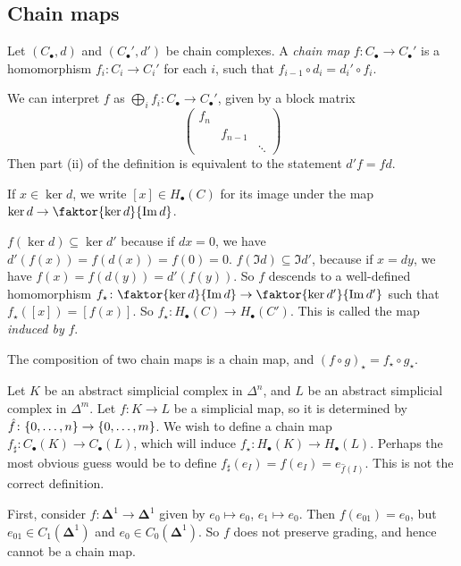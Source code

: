 \subsection{Chain maps}
\begin{definition}
	Let \( (C_\bullet, d) \) and \( (C_\bullet', d') \) be chain complexes.
	A \emph{chain map} \( f \colon C_\bullet \to C_\bullet' \) is a homomorphism \( f_i \colon C_i \to C_i' \) for each \( i \), such that \( f_{i-1} \circ d_i = d_i' \circ f_i \).
\end{definition}
\begin{remark}
	We can interpret \( f \) as \( \bigoplus_i f_i \colon C_\bullet \to C_\bullet' \), given by a block matrix
	\[ \begin{pmatrix}
		f_n \\
		& f_{n-1} \\
		& & \ddots
	\end{pmatrix} \]
	Then part (ii) of the definition is equivalent to the statement \( d' f = f d \).
\end{remark}
If \( x \in \ker d \), we write \( [x] \in H_\bullet(C) \) for its image under the map \( \ker d \to \faktor{\ker d}{\Im d} \).
\begin{remark}
	\( f(\ker d) \subseteq \ker d' \) because if \( dx = 0 \), we have \( d'(f(x)) = f(d(x)) = f(0) = 0 \).
	\( f(\Im d) \subseteq \Im d' \), because if \( x = dy \), we have \( f(x) = f(d(y)) = d'(f(y)) \).
	So \( f \) descends to a well-defined homomorphism \( f_\star \colon \faktor{\ker d}{\Im d} \to \faktor{\ker d'}{\Im d'} \) such that \( f_\star([x]) = [f(x)] \).
	So \( f_\star \colon H_\bullet(C) \to H_\bullet(C') \).
	This is called the map \emph{induced by} \( f \).
\end{remark}
\begin{remark}
	The composition of two chain maps is a chain map, and \( (f \circ g)_\star = f_\star \circ g_\star \).
\end{remark}
Let \( K \) be an abstract simplicial complex in \( \Delta^n \), and \( L \) be an abstract simplicial complex in \( \Delta^m \).
Let \( f \colon K \to L \) be a simplicial map, so it is determined by \( \hat f \colon \qty{0, \dots, n} \to \qty{0, \dots, m} \).
We wish to define a chain map \( f_\sharp \colon C_\bullet(K) \to C_\bullet(L) \), which will induce \( f_\star \colon H_\bullet(K) \to H_\bullet(L) \).
Perhaps the most obvious guess would be to define \( f_\sharp(e_I) = f(e_I) = e_{\hat f(I)} \).
This is not the correct definition.

First, consider \( f \colon \bm \Delta^1 \to \bm \Delta^1 \) given by \( e_0 \mapsto e_0 \), \( e_1 \mapsto e_0 \).
Then \( f(e_{01}) = e_0 \), but \( e_{01} \in C_1(\bm\Delta^1) \) and \( e_0 \in C_0(\bm\Delta^1) \).
So \( f \) does not preserve grading, and hence cannot be a chain map.

